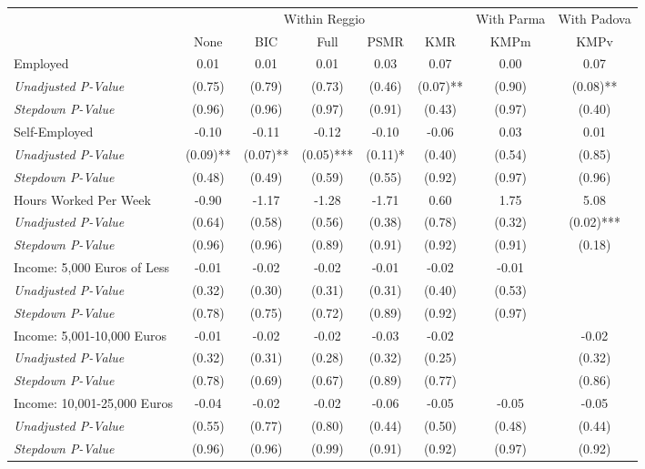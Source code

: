 \begin{tabular}{l c c c c c c c}
\toprule
& \multicolumn{5}{c}{Within Reggio} & With Parma & With Padova \\\cmidrule(lr){2-6} \cmidrule(lr){7-7} \cmidrule(lr){8-8}
 & None & BIC & Full & PSMR & KMR & KMPm & KMPv \\
\midrule
Employed & 0.01 & 0.01 & 0.01 & 0.03 & 0.07 & 0.00 & 0.07 \\
\quad \textit{Unadjusted P-Value} & (0.75) & (0.79) & (0.73) & (0.46) & (0.07)** & (0.90) & (0.08)** \\
\quad \textit{Stepdown P-Value} & (0.96) & (0.96) & (0.97) & (0.91) & (0.43) & (0.97) & (0.40) \\
Self-Employed & -0.10 & -0.11 & -0.12 & -0.10 & -0.06 & 0.03 & 0.01 \\
\quad \textit{Unadjusted P-Value} & (0.09)** & (0.07)** & (0.05)*** & (0.11)* & (0.40) & (0.54) & (0.85) \\
\quad \textit{Stepdown P-Value} & (0.48) & (0.49) & (0.59) & (0.55) & (0.92) & (0.97) & (0.96) \\
Hours Worked Per Week & -0.90 & -1.17 & -1.28 & -1.71 & 0.60 & 1.75 & 5.08 \\
\quad \textit{Unadjusted P-Value} & (0.64) & (0.58) & (0.56) & (0.38) & (0.78) & (0.32) & (0.02)*** \\
\quad \textit{Stepdown P-Value} & (0.96) & (0.96) & (0.89) & (0.91) & (0.92) & (0.91) & (0.18) \\
Income: 5,000 Euros of Less & -0.01 & -0.02 & -0.02 & -0.01 & -0.02 & -0.01 &  \\
\quad \textit{Unadjusted P-Value} & (0.32) & (0.30) & (0.31) & (0.31) & (0.40) & (0.53) & \\
\quad \textit{Stepdown P-Value} & (0.78) & (0.75) & (0.72) & (0.89) & (0.92) & (0.97) &  \\
Income: 5,001-10,000 Euros & -0.01 & -0.02 & -0.02 & -0.03 & -0.02 &  & -0.02 \\
\quad \textit{Unadjusted P-Value} & (0.32) & (0.31) & (0.28) & (0.32) & (0.25) & & (0.32) \\
\quad \textit{Stepdown P-Value} & (0.78) & (0.69) & (0.67) & (0.89) & (0.77) &  & (0.86) \\
Income: 10,001-25,000 Euros & -0.04 & -0.02 & -0.02 & -0.06 & -0.05 & -0.05 & -0.05 \\
\quad \textit{Unadjusted P-Value} & (0.55) & (0.77) & (0.80) & (0.44) & (0.50) & (0.48) & (0.44) \\
\quad \textit{Stepdown P-Value} & (0.96) & (0.96) & (0.99) & (0.91) & (0.92) & (0.97) & (0.92) \\

\end{tabular}
